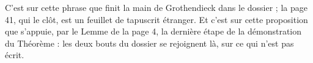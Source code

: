 \documentclass[11pt,a4paper]{article}
\begin{document}
C'est sur cette phrase que finit la main de Grothendieck dans le dossier ; la
page 41, qui le clôt, est un feuillet de tapuscrit étranger. Et c'est sur cette
proposition que s'appuie, par le Lemme de la page 4, la dernière étape de la
démonstration du Théorème : les deux bouts du dossier se rejoignent là, sur
ce qui n'est pas écrit.
\end{document}
